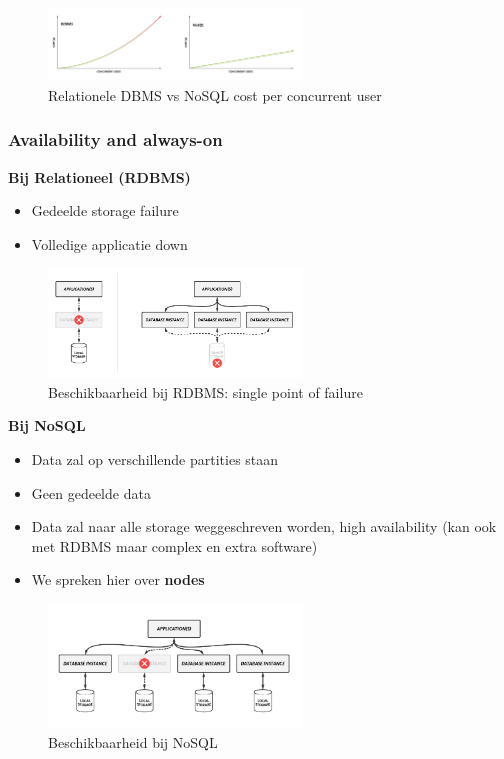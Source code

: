 \documentclass{article}
\newcommand{\bold}[1]{\textbf{#1}}
\begin{document}
\begin{figure}[H]
    \centering
    \includegraphics[width=0.6\textwidth]{nosql-cost.png}
    \caption{Relationele DBMS vs NoSQL cost per concurrent user}
\end{figure}


\subsubsection{Availability and always-on}

\bold{Bij Relationeel (RDBMS)}


\begin{itemize}
    \item Gedeelde storage failure
    \item Volledige applicatie down
\end{itemize}

\begin{figure}[H]
    \centering
    \includegraphics[width=0.6\textwidth]{rdbms-availability.png}
    \caption{Beschikbaarheid bij RDBMS: single point of failure}
\end{figure}

\bold{Bij NoSQL}

\begin{itemize}
    \item Data zal op verschillende partities staan
    \item Geen gedeelde data
    \item Data zal naar alle storage weggeschreven worden, high availability (kan ook met RDBMS maar complex en extra software)
    \item We spreken hier over \bold{nodes}
\end{itemize}

\begin{figure}[H]
    \centering
    \includegraphics[width=0.6\textwidth]{nosql-availability.png}
    \caption{Beschikbaarheid bij NoSQL}
\end{figure}
\end{document}
